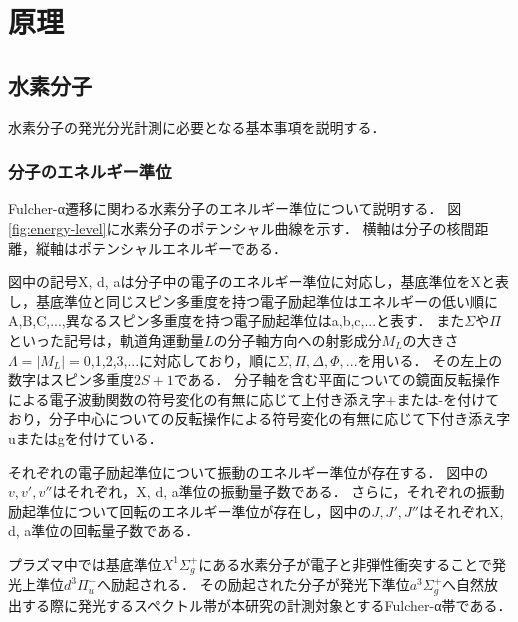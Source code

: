 \chapter{原理}

\section{水素分子}
水素分子の発光分光計測に必要となる基本事項を説明する．
\subsection{分子のエネルギー準位}
Fulcher-α遷移に関わる水素分子のエネルギー準位について説明する．
図\ref{fig:energy-level}に水素分子のポテンシャル曲線を示す．
横軸は分子の核間距離，縦軸はポテンシャルエネルギーである．

図中の記号X, d, aは分子中の電子のエネルギー準位に対応し，基底準位をXと表し，基底準位と同じスピン多重度を持つ電子励起準位はエネルギーの低い順にA,B,C,...,異なるスピン多重度を持つ電子励起準位はa,b,c,...と表す．
また$\Sigma$や$\Pi$といった記号は，軌道角運動量$L$の分子軸方向への射影成分$M_L$の大きさ$\Lambda = |M_L|=$0,1,2,3,...に対応しており，順に$\Sigma,\Pi,\Delta,\Phi,...$を用いる\cite{bunsibunko-no-kiso}．
その左上の数字はスピン多重度$2S+1$である\cite{bunsibunko-no-kiso}．
分子軸を含む平面についての鏡面反転操作による電子波動関数の符号変化の有無に応じて上付き添え字+または-を付けており，分子中心についての反転操作による符号変化の有無に応じて下付き添え字uまたはgを付けている\cite{bunsibunko-no-kiso}．

それぞれの電子励起準位について振動のエネルギー準位が存在する．
図中の$v, v', v''$はそれぞれ，X, d, a準位の振動量子数である．
さらに，それぞれの振動励起準位について回転のエネルギー準位が存在し，図中の$J, J', J''$はそれぞれX, d, a準位の回転量子数である．

プラズマ中では基底準位$X^1 \Sigma^+_g$にある水素分子が電子と非弾性衝突することで発光上準位$d^3 \Pi^-_u$へ励起される．
その励起された分子が発光下準位$a^3 \Sigma^+_g$へ自然放出する際に発光するスペクトル帯が本研究の計測対象とするFulcher-α帯である．

